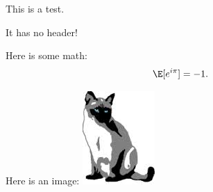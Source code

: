 

This is a test.

It has no header!

Here is some math:
\[
    \E[ e^{i\pi} ] = -1 .
\]

Here is an image:
\includegraphics{resources/latexml-cat}

